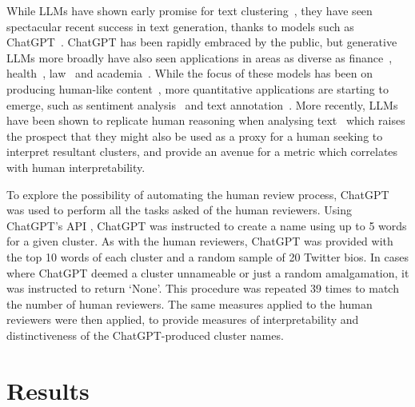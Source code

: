 \documentclass{article}
\begin{document}
While LLMs have shown early promise for text clustering~\cite{subakti2022}, they have seen spectacular recent success in text generation, thanks to models such as ChatGPT~\cite{openai2023}.  ChatGPT has been rapidly embraced by the public, but generative LLMs more broadly have also seen applications in areas as diverse as 
finance~\cite{huang2023}, health~\cite{si2019}, law~\cite{chalkidis2019} and academia~\cite{altmae2023}.  While the focus of these models has been on producing human-like content~\cite{liu2023}, more quantitative applications are starting to emerge, such as sentiment analysis~\cite{susnjak2023} and text annotation~\cite{gilardi2023}. More recently, LLMs have been shown to replicate human reasoning when analysing text~\cite{aher2023using} which raises the prospect that they might also be used as a proxy for a human seeking to interpret resultant clusters, and provide an avenue for a metric which correlates with human interpretability.

To explore the possibility of automating the human review process, ChatGPT was used to perform all the tasks asked of the human reviewers.  Using ChatGPT's API \cite{openai_2023_gpt4}, ChatGPT was instructed to create a name using up to 5 words for a given cluster.  As with the human reviewers, ChatGPT was provided with the top 10 words of each cluster and a random sample of 20 Twitter bios.  In cases where ChatGPT deemed a cluster unnameable or just a random amalgamation, it was instructed to return `None'. This procedure was repeated 39 times to match the number of human reviewers.  The same measures applied to the human reviewers were then applied, to provide measures of interpretability and distinctiveness of the ChatGPT-produced cluster names.


\section{{Results}}
\end{document}
